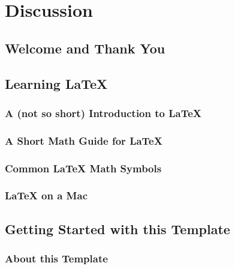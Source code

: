 
\chapter{Discussion} %

\label{discussion} %


\newcommand{\keyword}[1]{\textbf{#1}}
\newcommand{\tabhead}[1]{\textbf{#1}}
\newcommand{\code}[1]{\texttt{#1}}
\newcommand{\file}[1]{\texttt{\bfseries#1}}
\newcommand{\option}[1]{\texttt{\itshape#1}}


\section{Welcome and Thank You}



\section{Learning \LaTeX{}}


\subsection{A (not so short) Introduction to \LaTeX{}}


\subsection{A Short Math Guide for \LaTeX{}}


\subsection{Common \LaTeX{} Math Symbols}


\subsection{\LaTeX{} on a Mac}
 

\section{Getting Started with this Template}


\subsection{About this Template}


